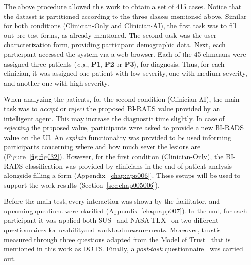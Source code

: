 \vspace{0.05mm}

The above procedure allowed this work to obtain a set of 415 cases.
Notice that the dataset is partitioned according to the three classes mentioned above.
Similar for both conditions (Clinician-Only and Clinician-AI), the first task was to fill out pre-test forms, as already mentioned.
The second task was the user characterization form, providing participant demographic data.
Next, each participant accessed the system via a web browser.
Each of the 45 clinicians were assigned three patients ({\it e.g.}, {\bf P1}, {\bf P2} or {\bf P3}), for diagnosis.
Thus, for each clinician, it was assigned one patient with low severity, one with medium severity, and another one with high severity.

When analyzing the patients, for the second condition (Clinician-AI), the main task was to {\it accept} or {\it reject} the proposed \ac{BI-RADS} value provided by an intelligent agent.
This may increase the diagnostic time slightly.
In case of {\it rejecting} the proposed value, participants were asked to provide a new \ac{BI-RADS} value on the \ac{UI}.
An {\it explain} functionality was provided to be used informing participants concerning where and how much sever the lesions are (Figure~\ref{fig:fig032}).
However, for the first condition (Clinician-Only), the \ac{BI-RADS} classification was provided by clinicians in the end of patient analysis alongside filling a form (Appendix~\ref{chap:app006}).
These setups will be used to support the work results (Section~\ref{sec:chap005006}).

Before the main test, every interaction was shown by the facilitator, and upcoming questions were clarified (Appendix~\ref{chap:app007}).
In the end, for each participant it was applied both \ac{SUS}~\cite{Tyllinen:2016:WNN:2858036.2858570} and \ac{NASA-TLX}~\cite{10.1145/3399715.3399744} on two different questionnaires for usability\footnotemark[10] and workload\footnotemark[11] measurements.
Moreover, trust\footnotemark[12] is measured through three questions adapted from the Model of Trust~\cite{CALISTO2021102607} that is mentioned in this work as \ac{DOTS}.
Finally, a {\it post-task} questionnaire~\cite{10.1145/3132272.3134111} was carried out.


